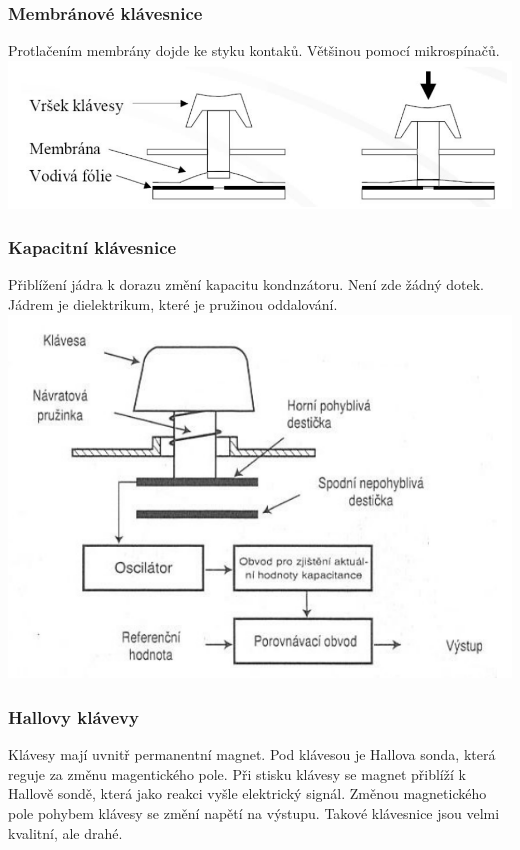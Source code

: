     \subsubsection{Membránové klávesnice}
      Protlačením membrány dojde ke styku kontaků. Většinou pomocí mikrospínačů.\\
      \includegraphics[width=1\linewidth]{TVY-POS/Vstupní zařízení/membranekey.png}
    \subsubsection{Kapacitní klávesnice}
      Přiblížení jádra k dorazu změní kapacitu kondnzátoru.
      Není zde žádný dotek.
      Jádrem je dielektrikum, které je pružinou oddalování.\\
      \includegraphics[width=1\linewidth]{TVY-POS/Vstupní zařízení/capacitorkey.png}
    \subsubsection{Hallovy klávevy}
      Klávesy mají uvnitř permanentní magnet.
      Pod klávesou je Hallova sonda, která reguje za změnu magentického pole.
      Při stisku klávesy se magnet přiblíží k Hallově sondě, která jako reakci vyšle elektrický signál.
      Změnou magnetického pole pohybem klávesy se změní napětí na výstupu.
      Takové klávesnice jsou velmi kvalitní, ale drahé.
